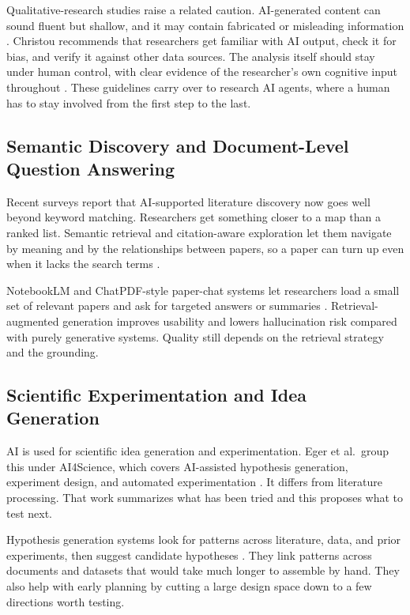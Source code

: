 \documentclass[sn-basic,Numbered]{sn-jnl}
\begin{document}
Qualitative-research studies raise a related caution. AI-generated
content can sound fluent but shallow, and it may contain fabricated or
misleading information \cite{christou2023qualitative}. Christou
recommends that researchers get familiar with AI output, check it for
bias, and verify it against other data sources. The analysis itself
should stay under human control, with clear evidence of the
researcher's own cognitive input throughout
\cite{christou2023qualitative}. These guidelines carry over to research
AI agents, where a human has to stay involved from the first step to the
last.

\subsection{Semantic Discovery and Document-Level Question Answering}

Recent surveys report that AI-supported literature discovery now goes
well beyond keyword matching. Researchers get something closer to a map
than a ranked list. Semantic retrieval and citation-aware exploration
let them navigate by meaning and by the relationships between papers, so
a paper can turn up even when it lacks the search terms
\cite{eger2025transformingscience}.

NotebookLM and ChatPDF-style paper-chat systems let researchers load a
small set of relevant papers and ask for targeted answers or summaries
\cite{eger2025transformingscience}. Retrieval-augmented generation
improves usability and lowers hallucination risk compared with purely
generative systems. Quality still depends on the retrieval strategy and
the grounding.

\subsection{Scientific Experimentation and Idea Generation}

AI is used for scientific idea generation and experimentation.
Eger et al.\ group this under AI4Science, which covers AI-assisted
hypothesis generation, experiment design, and automated experimentation
\cite{eger2025transformingscience}. It differs from literature
processing. That work summarizes what has been tried and this
proposes what to test next.

Hypothesis generation systems look for patterns across literature, data,
and prior experiments, then suggest candidate hypotheses
\cite{eger2025transformingscience}. They link patterns across documents
and datasets that would take much longer to assemble by hand. They 
also help with early planning by cutting a large design space down to a
few directions worth testing.
\end{document}
